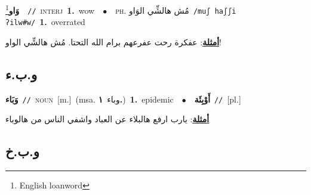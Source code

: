 \documentclass[10pt,a4paper,twoside]{article} %
\begin{document}
\begin{multicols}{2}
{{\setlength\topsep{0pt}\textbf{\foreignlanguage{arabic}{وَاو}}\footnote{English loanword}\ \ {\color{gray}\texttt{//}\color{black}}\ \textsc{interj}\ \textbf{1.}~wow\ \ $\bullet$\ \ \textsc{ph.} \color{gray} \foreignlanguage{arabic}{مُش هالشِّي الوَاو}\color{black}\ {\color{gray}\texttt{/{\sffamily muʃ haʃʃi ʔilw\#w}/}\color{black}}\ \textbf{1.}~overrated\  \begin{flushright}\color{gray}\foreignlanguage{arabic}{\textbf{\underline{\foreignlanguage{arabic}{أمثلة}}}: عفكرة رحت عفرعهم برام الله التحتا. مُش هالشِّي الواو!}\end{flushright}\color{black}} \vspace{2mm}

\vspace{-3mm}
\subsection*{\color{blue}\foreignlanguage{arabic}{و.ب.ء}\color{blue}{}} 

{\setlength\topsep{0pt}\textbf{\foreignlanguage{arabic}{وَبَاء}}\ {\color{gray}\texttt{//}\color{black}}\ \textsc{noun}\ [m.]\ \color{gray}(msa. \foreignlanguage{arabic}{وباء}~\foreignlanguage{arabic}{\textbf{١.}})\color{black}\ \textbf{1.}~epidemic\ \ $\bullet$\ \ \setlength\topsep{0pt}\textbf{\foreignlanguage{arabic}{أَوْبِئَة}}\ {\color{gray}\texttt{//}\color{black}}\ [pl.]\  \begin{flushright}\color{gray}\foreignlanguage{arabic}{\textbf{\underline{\foreignlanguage{arabic}{أمثلة}}}: يارب ارفع هالبلاء عن العباد واشفي الناس من هالوباء}\end{flushright}\color{black}} \vspace{2mm}

\vspace{-3mm}
\subsection*{\color{blue}\foreignlanguage{arabic}{و.ب.خ}\color{blue}{}} 

}
\end{multicols}
\end{document}
